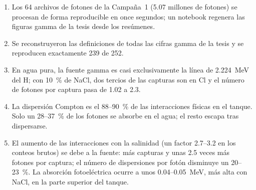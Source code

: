 \documentclass[11pt,a4paper]{article}
\begin{document}
\begin{enumerate}
  \item Los 64 archivos de fotones de la Campaña~1 (5.07 millones de fotones) se procesan de forma reproducible en once segundos; un notebook regenera las figuras gamma de la tesis desde los resúmenes.
  \item Se reconstruyeron las definiciones de todas las cifras gamma de la tesis y se reproducen exactamente 239 de 252. 
  \item En agua pura, la fuente gamma es casi exclusivamente la línea de 2.224~MeV del H; con 10~\% de NaCl, dos tercios de las capturas son en Cl y el número de fotones por captura pasa de 1.02 a 2.3.
  \item La dispersión Compton es el 88--90~\% de las interacciones físicas en el tanque. Solo un 28--37~\% de los fotones se absorbe en el agua; el resto escapa tras dispersarse.
  \item El aumento de las interacciones con la salinidad (un factor 2.7--3.2 en los conteos brutos) se debe a la fuente: más capturas y unas 2.5 veces más fotones por captura; el número de dispersiones por fotón disminuye un 20--23~\%. La absorción fotoeléctrica ocurre a unos 0.04--0.05~MeV, más alta con NaCl, en la parte superior del tanque.
\end{enumerate}
\end{document}
